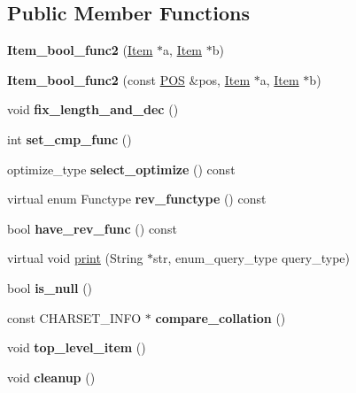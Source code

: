 \subsection*{Public Member Functions}
\begin{DoxyCompactItemize}
\item 
\mbox{\label{classItem__bool__func2_a5cfc59f06f8f3594de62fe3fb1696c17}} 
{\bfseries Item\+\_\+bool\+\_\+func2} (\mbox{\hyperlink{classItem}{Item}} $\ast$a, \mbox{\hyperlink{classItem}{Item}} $\ast$b)
\item 
\mbox{\label{classItem__bool__func2_abfb7349dff19df5590f3f86dc98ef25c}} 
{\bfseries Item\+\_\+bool\+\_\+func2} (const \mbox{\hyperlink{structYYLTYPE}{P\+OS}} \&pos, \mbox{\hyperlink{classItem}{Item}} $\ast$a, \mbox{\hyperlink{classItem}{Item}} $\ast$b)
\item 
\mbox{\label{classItem__bool__func2_acba3e7961068afa9cead67b866cdea97}} 
void {\bfseries fix\+\_\+length\+\_\+and\+\_\+dec} ()
\item 
\mbox{\label{classItem__bool__func2_a164c0cd2543b935f7ab6fe3b317ce8cd}} 
int {\bfseries set\+\_\+cmp\+\_\+func} ()
\item 
\mbox{\label{classItem__bool__func2_aab57efaf5568cea6b63721254f1b4fa5}} 
optimize\+\_\+type {\bfseries select\+\_\+optimize} () const
\item 
\mbox{\label{classItem__bool__func2_ac0718ac85ce9196f753fc0951e6cb12e}} 
virtual enum Functype {\bfseries rev\+\_\+functype} () const
\item 
\mbox{\label{classItem__bool__func2_ad057a9f679503709ca96884d7265f871}} 
bool {\bfseries have\+\_\+rev\+\_\+func} () const
\item 
virtual void \mbox{\hyperlink{classItem__bool__func2_a12469a240720c26bef325a4ee5b02f50}{print}} (String $\ast$str, enum\+\_\+query\+\_\+type query\+\_\+type)
\item 
\mbox{\label{classItem__bool__func2_a157ca0e5def8205986bc565f44fb284f}} 
bool {\bfseries is\+\_\+null} ()
\item 
\mbox{\label{classItem__bool__func2_a0dc4361ba5cd372214e7db9bc0530218}} 
const C\+H\+A\+R\+S\+E\+T\+\_\+\+I\+N\+FO $\ast$ {\bfseries compare\+\_\+collation} ()
\item 
\mbox{\label{classItem__bool__func2_a96a33a079a5213c326c76d8c2a25cd25}} 
void {\bfseries top\+\_\+level\+\_\+item} ()
\item 
\mbox{\label{classItem__bool__func2_aa0d349e2a534f6487595d7f954261744}} 
void {\bfseries cleanup} ()
\end{DoxyCompactItemize}
